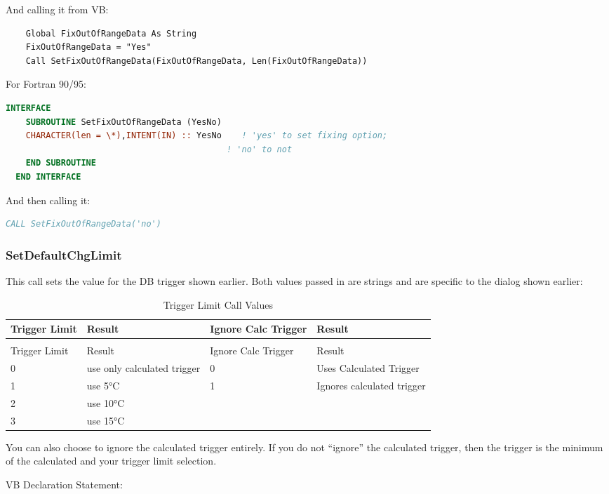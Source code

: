 And calling it from VB:

\begin{lstlisting}
    Global FixOutOfRangeData As String
    FixOutOfRangeData = "Yes"
    Call SetFixOutOfRangeData(FixOutOfRangeData, Len(FixOutOfRangeData))
\end{lstlisting}

For Fortran 90/95:

\begin{lstlisting}[language=Fortran]
  INTERFACE
    SUBROUTINE SetFixOutOfRangeData (YesNo)
    CHARACTER(len = \*),INTENT(IN) :: YesNo    ! 'yes' to set fixing option;
                                            ! 'no' to not
    END SUBROUTINE
  END INTERFACE
\end{lstlisting}

And then calling it:

\begin{lstlisting}[language=Fortran]
CALL SetFixOutOfRangeData('no')
\end{lstlisting}

\subsubsection{SetDefaultChgLimit}\label{setdefaultchglimit}

This call sets the value for the DB trigger shown earlier. Both values passed in are strings and are specific to the dialog shown earlier:

\begin{longtable}[c]{p{1.5in}p{1.5in}p{1.5in}p{1.5in}}
\caption{Trigger Limit Call Values \label{table:trigger-limit-call-values}} \tabularnewline
\toprule 
Trigger Limit & Result & Ignore Calc Trigger & Result \tabularnewline
\midrule
\endfirsthead

\caption[]{Trigger Limit Call Values} \tabularnewline
\toprule 
Trigger Limit & Result & Ignore Calc Trigger & Result \tabularnewline
\midrule
\endhead
0 & use only calculated trigger & 0 & Uses Calculated Trigger \tabularnewline
1 & use 5°C & 1 & Ignores calculated trigger \tabularnewline
2 & use 10°C &  &  \tabularnewline
3 & use 15°C &  &  \tabularnewline
\bottomrule
\end{longtable}

You can also choose to ignore the calculated trigger entirely. If you do not ``ignore'' the calculated trigger, then the trigger is the minimum of the calculated and your trigger limit selection.

VB Declaration Statement:

